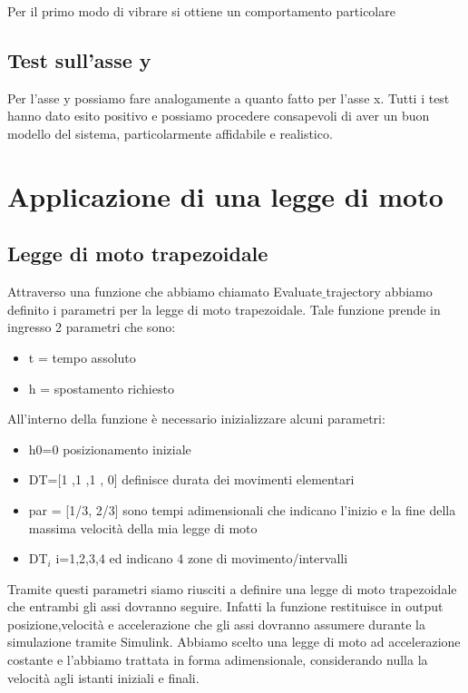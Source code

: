 \documentclass{article}
\begin{document}
Per il primo modo di vibrare si ottiene un comportamento particolare

\subsection{ Test sull'asse y}
Per l'asse y possiamo fare analogamente a quanto fatto per l'asse x.
Tutti i test hanno dato esito positivo e possiamo procedere consapevoli di aver un buon modello del sistema, particolarmente affidabile e realistico.

\section{Applicazione di una legge di moto}
\subsection{Legge di moto trapezoidale}
Attraverso una funzione che abbiamo chiamato Evaluate$\_$trajectory abbiamo definito i parametri per la legge di moto 
trapezoidale. Tale funzione prende in ingresso 2 parametri che sono:
\begin{itemize}
    \item  t = tempo assoluto
    \item  h = spostamento richiesto
\end{itemize}
All'interno della funzione è necessario inizializzare alcuni parametri:
\begin{itemize}
    \item h0=0 posizionamento iniziale 
    \item DT=[1 ,1 ,1 , 0] definisce durata dei movimenti elementari
    \item par = [1/3, 2/3] sono tempi adimensionali che indicano l'inizio e la fine della massima velocità della mia
    legge di moto
    \item DT$_{i}$ i=1,2,3,4 ed indicano 4 zone di movimento/intervalli 
\end{itemize}
Tramite questi parametri siamo riusciti a definire una legge di moto trapezoidale che entrambi gli assi dovranno seguire.
Infatti la funzione restituisce in output posizione,velocità e accelerazione  che gli assi dovranno assumere durante la simulazione tramite Simulink. 
Abbiamo scelto una legge di moto ad accelerazione costante e l'abbiamo trattata in forma adimensionale, considerando nulla la velocità agli istanti iniziali e finali.
\end{document}
